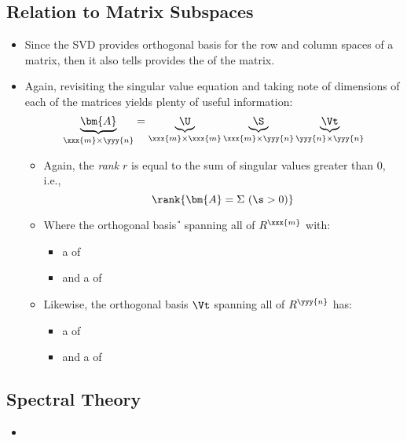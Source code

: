 \begin{itemize}
  \subsection{Relation to Matrix Subspaces}\label{SVD Relation to Subspaces}
  \begin{itemize}
    \item Since the SVD provides orthogonal basis for the row and column spaces of a matrix, then it also tells provides the \hyperref[Null Space]{} of the matrix.
    \item Again, revisiting the singular value equation and taking note of dimensions of each of the matrices yields plenty of useful information:
    \[%
    \underbrace{\bm{A}}_{\xxx{m} \times \yyy{n}} = \underbrace{\U}_{\xxx{m} \times \xxx{m}} \underbrace{\S}_{\xxx{m} \times \yyy{n}} \underbrace{\Vt}_{\yyy{n} \times \yyy{n}}
    \]%
    \begin{itemize}
      \item Again, the \emph{rank \(r\)} is equal to the sum of singular values greater than 0, i.e.,
      \[%
      \rank{\bm{A}=\Sigma~(\s > 0)}
      \]%
      \item Where the orthogonal basis \U~spanning all of \(R^{\xxx{m}}\) with:
        \begin{itemize}
          \item a  of 
          \item and a  of 
        \end{itemize}
      \item Likewise, the orthogonal basis \(\Vt\) spanning all of \(R^\yyy{n}\) has:
      \begin{itemize}
        \item a  of 
        \item and a  of 
      \end{itemize}
    \end{itemize}
  \end{itemize}

  \subsection{Spectral Theory}\label{Spectral Theory}
  \begin{itemize}
    \item 
  \end{itemize}
  
\end{itemize}


